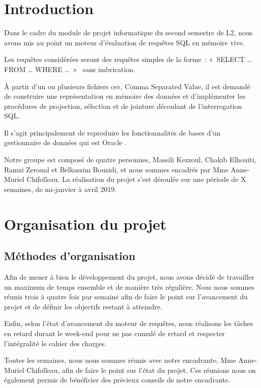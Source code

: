 \documentclass[oneside,13pt,a4paper]{report}
\begin{document}
    \chapter{Introduction}

        Dans le cadre du module de projet informatique du second semestre de L2, nous avons mis au point un moteur d’évaluation de requêtes SQL en mémoire vive.

        Les requêtes considérées seront des requêtes simples de la forme : « SELECT … FROM … WHERE … »  sans imbrication.

        À partir d’un ou plusieurs fichiers csv, Comma Separated Value, il est demandé de construire une représentation en mémoire des données et d’implémenter les procédures de projection, sélection et de jointure découlant de l’interrogation SQL.

        Il s’agit principalement de reproduire les fonctionnalités de bases d’un gestionnaire de données qui est Oracle .

        Notre groupe est composé de quatre personnes, Massili Kezzoul, Chakib Elhouiti, Ramzi Zeroual et Belkassim Bouzidi, et nous sommes encadrés par Mme Anne-Muriel Chifolleau. La réalisation du projet s’est déroulée sur une période de X semaines, de mi-janvier à avril 2019.


    \chapter{Organisation du projet}
        \section{Méthodes d’organisation}

            Afin de mener à bien le développement du projet, nous avons décidé de travailler un maximum de temps ensemble et de manière très régulière. Nous nous sommes réunis trois à quatre fois par semaine afin de faire le point sur l’avancement du projet et de définir les objectifs restant à atteindre.
            
            Enfin, selon l’état d’avancement du moteur de requêtes, nous réalisons les tâches en retard durant le week-end pour ne pas cumulé de retard et respecter l’intégralité le cahier des charges.
            
            Toutes les semaines, nous nous sommes réunis avec notre encadrante, Mme Anne-Muriel Chifolleau, afin de faire le point sur l’état du projet. Ces réunions nous on également permis de bénéficier des précieux conseils de notre encadrante.
\end{document}
